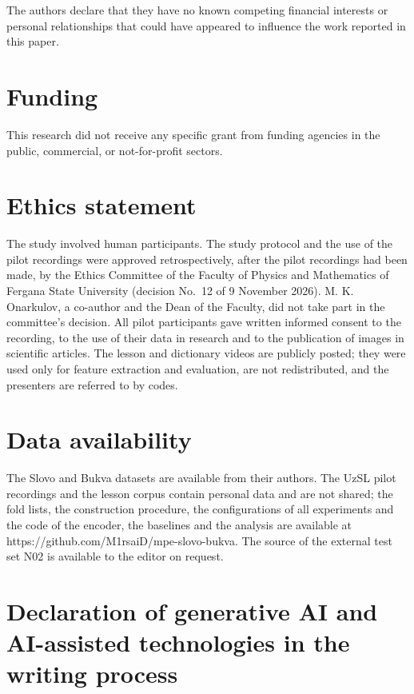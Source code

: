\documentclass[a4paper,fleqn]{cas-dc}
\begin{document}
The authors declare that they have no known competing financial interests or personal relationships that could have appeared to influence the work reported in this paper.

\hypertarget{funding}{%
\section*{Funding}\label{funding}}

This research did not receive any specific grant from funding agencies in the public, commercial, or not-for-profit sectors.

\hypertarget{ethics-statement}{%
\section*{Ethics statement}\label{ethics-statement}}

The study involved human participants. The study protocol and the use of the pilot recordings were approved retrospectively, after the pilot recordings had been made, by the Ethics Committee of the Faculty of Physics and Mathematics of Fergana State University (decision No.~12 of 9 November 2026). M. K. Onarkulov, a co-author and the Dean of the Faculty, did not take part in the committee's decision. All pilot participants gave written informed consent to the recording, to the use of their data in research and to the publication of images in scientific articles. The lesson and dictionary videos are publicly posted; they were used only for feature extraction and evaluation, are not redistributed, and the presenters are referred to by codes.

\hypertarget{data-availability}{%
\section*{Data availability}\label{data-availability}}

The Slovo and Bukva datasets are available from their authors. The UzSL pilot recordings and the lesson corpus contain personal data and are not shared; the fold lists, the construction procedure, the configurations of all experiments and the code of the encoder, the baselines and the analysis are available at https://github.com/M1rsaiD/mpe-slovo-bukva. The source of the external test set N02 is available to the editor on request.

\hypertarget{declaration-of-generative-ai-and-ai-assisted-technologies-in-the-writing-process}{%
\section*{Declaration of generative AI and AI-assisted technologies in the writing process}\label{declaration-of-generative-ai-and-ai-assisted-technologies-in-the-writing-process}}
\end{document}
